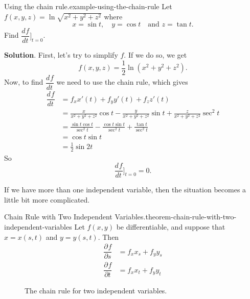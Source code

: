 \documentclass[10pt,]{book}
\numberwithin{equation}{section}
\newcommand{\dv}[3][]{\dfrac{d^{#1} #2}{d #3^{#1}}}
\newcommand{\pdv}[3][]{\dfrac{\partial^{#1} #2}{\partial #3^{#1}}}
\begin{document}
\begin{example}{Using the chain rule.}{example-using-the-chain-rule}%
\hypertarget{p-1386}{}%
Let \(f(x,y,z) = \ln\sqrt{x^{2}+y^{2}+z^{2}}\) where%
\begin{equation*}
x = \sin t,\quad y = \cos t\quad\text{and } z = \tan t.
\end{equation*}
Find \(\dv{f}{t}\bigg]_{t=0}\).%
\par\smallskip%
\noindent\textbf{Solution}.\hypertarget{solution-224}{}\quad%
\hypertarget{p-1387}{}%
First, let's try to simplify \(f\). If we do so, we get%
\begin{equation*}
f(x,y,z) = \frac{1}{2}\ln(x^{2} + y^{2} + z^{2}).
\end{equation*}
Now, to find \(\dv{f}{t}\) we need to use the chain rule, which gives%
\begin{align*}
\dv{f}{t} & = f_{x}x'(t) + f_{y}y'(t) + f_{z}z'(t) \\
& = \frac{x}{x^{2} + y^{2} + z^{2}}\cos t  - \frac{y}{x^{2} + y^{2} + z^{2}}\sin t + \frac{z}{x^{2} + y^{2} + z^{2}}\sec^{2}t\\
& = \frac{\sin t\cos t}{\sec^{2}t} - \frac{\cos t\sin t}{\sec^{2}t} + \frac{\tan t}{\sec^{2}t}\\
& = \cos t\sin t \\
& = \frac{1}{2}\sin2t 
\end{align*}
So%
\begin{equation*}
\dv{f}{t}\bigg]_{t=0} = 0.
\end{equation*}
%
\end{example}
\hypertarget{p-1388}{}%
If we have more than one independent variable, then the situation becomes a little bit more complicated.%
\begin{theorem}{Chain Rule with Two Independent Variables.}{}{theorem-chain-rule-with-two-independent-variables}%
\hypertarget{p-1389}{}%
Let \(f(x,y)\) be differentiable, and suppose that \(x = x(s,t)\) and \(y = y(s,t)\). Then%
\begin{align*}
\pdv{f}{s} & = f_{x}x_{s} + f_{y}y_{s} \\
\pdv{f}{t} & = f_{x}x_{t} + f_{y}y_{t} 
\end{align*}
%
\end{theorem}
\begin{figure}
\centering
{
}
\caption{The chain rule for two independent variables.\label{figure-chain-rule-two-independent-variables}}
\end{figure}
\end{document}
